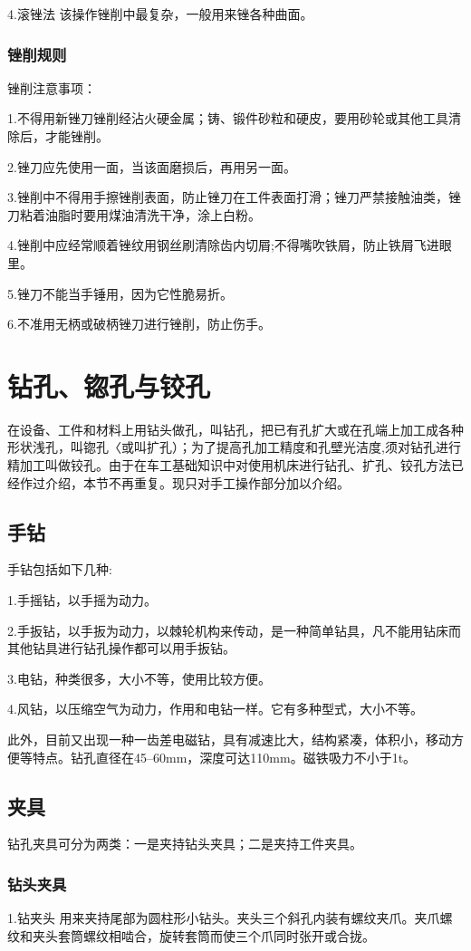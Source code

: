 \documentclass{ctexbook}
\begin{document}
4.滚锉法 该操作锉削中最复杂，一般用来锉各种曲面。

\subsubsection{锉削规则}
锉削注意事项：

1.不得用新锉刀锉削经沾火硬金属；铸、锻件砂粒和硬皮，要用砂轮或其他工具清除后，才能锉削。

2.锉刀应先使用一面，当该面磨损后，再用另一面。

3.锉削中不得用手擦锉削表面，防止锉刀在工件表面打滑；锉刀严禁接触油类，锉刀粘着油脂时要用煤油清洗干净，涂上白粉。

4.锉削中应经常顺着锉纹用钢丝刷清除齿内切屑;不得嘴吹铁屑，防止铁屑飞进眼里。

5.锉刀不能当手锤用，因为它性脆易折。

6.不准用无柄或破柄锉刀进行锉削，防止伤手。
\section{钻孔、锪孔与铰孔}
在设备、工件和材料上用钻头做孔，叫钻孔，把已有孔扩大或在孔端上加工成各种形状浅孔，叫锪孔〈或叫扩孔）；为了提高孔加工精度和孔壁光洁度,须对钻孔进行精加工叫做铰孔。由于在车工基础知识中对使用机床进行钻孔、扩孔、铰孔方法已经作过介绍，本节不再重复。现只对手工操作部分加以介绍。
\subsection{手钻}
手钻包括如下几种:

1.手摇钻，以手摇为动力。

2.手扳钻，以手扳为动力，以棘轮机构来传动，是一种简单钻具，凡不能用钻床而其他钻具进行钻孔操作都可以用手扳钻。

3.电钻，种类很多，大小不等，使用比较方便。

4.风钻，以压缩空气为动力，作用和电钻一样。它有多种型式，大小不等。

此外，目前又出现一种一齿差电磁钻，具有减速比大，结构紧凑，体积小，移动方便等特点。钻孔直径在45--60mm，深度可达110mm。磁铁吸力不小于1t。
\subsection{夹具}
钻孔夹具可分为两类：一是夹持钻头夹具；二是夹持工件夹具。
\subsubsection{钻头夹具}
1.钻夹头 用来夹持尾部为圆柱形小钻头。夹头三个斜孔内装有螺纹夹爪。夹爪螺纹和夹头套筒螺纹相啮合，旋转套筒而使三个爪同时张开或合拢。
\end{document}
